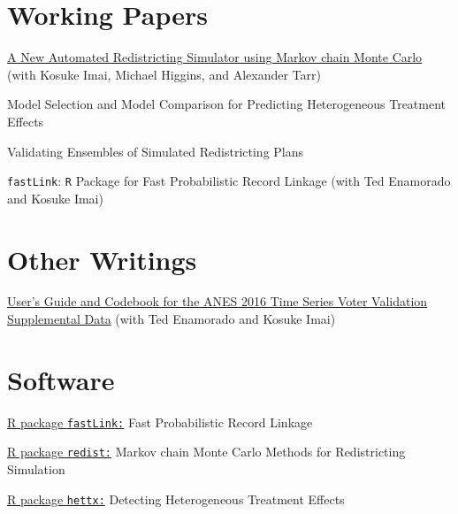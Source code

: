 \documentclass[]{deedy-resume-openfont}
\begin{document}
\section{Working Papers}
\href{https://imai.fas.harvard.edu/research/files/redist.pdf}{A New Automated Redistricting Simulator using Markov chain Monte Carlo} (with Kosuke Imai, Michael Higgins, and Alexander Tarr)\\\vspace{2mm}

Model Selection and Model Comparison for Predicting Heterogeneous Treatment Effects\\\vspace{2mm}

Validating Ensembles of Simulated Redistricting Plans\\\vspace{2mm}

\texttt{fastLink}: \texttt{R} Package for Fast Probabilistic Record Linkage (with Ted Enamorado and Kosuke Imai)\\\vspace{2mm}
\sectionsep

\section{Other Writings}
\href{https://www.electionstudies.org/wp-content/uploads/2018/03/anes_timeseries_2016voteval_userguidecodebook.pdf}{User’s Guide and Codebook for the ANES 2016 Time Series Voter Validation Supplemental Data} (with Ted Enamorado and Kosuke Imai)
\sectionsep

\section{Software}
\href{https://github.com/kosukeimai/fastLink}{R package \texttt{fastLink:}} Fast Probabilistic Record Linkage \\\vspace{2mm}

\href{https://github.com/kosukeimai/redist}{R package \texttt{redist:}} Markov chain Monte Carlo Methods for Redistricting Simulation\\\vspace{2mm}

\href{https://github.com/bfifield/hettx}{R package \texttt{hettx:}} Detecting Heterogeneous Treatment Effects\\\vspace{2mm}
\end{document}
